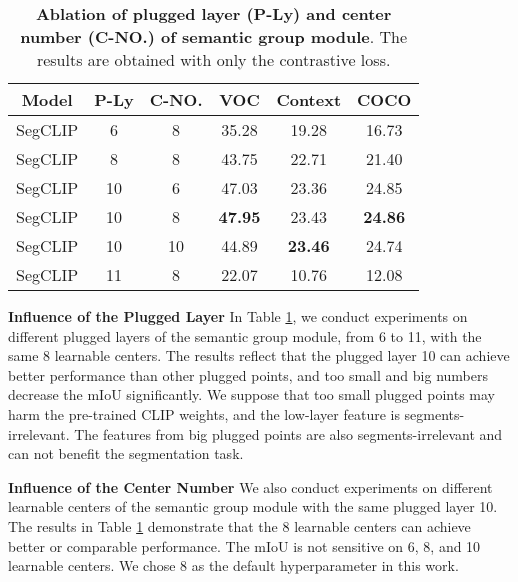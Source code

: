 \documentclass{article}
\theoremstyle{plain}
\theoremstyle{definition}
\theoremstyle{remark}
\begin{document}
\begin{table}[tp]
    \setlength{\tabcolsep}{5pt}
    \centering
    \begin{tabular}{cccccc}
        \toprule
        Model     & P-Ly & C-NO. & VOC & Context & COCO \\ \midrule
        SegCLIP     & 6  & 8 & 35.28 & 19.28 & 16.73 \\
        SegCLIP     & 8  & 8 & 43.75 & 22.71 & 21.40 \\
        SegCLIP     & 10  & 6 & 47.03 & 23.36 & 24.85 \\
        SegCLIP     & 10  & 8 & \textbf{47.95} & 23.43 & \textbf{24.86} \\
        SegCLIP     & 10  & 10 & 44.89 & \textbf{23.46} & 24.74 \\
        SegCLIP     & 11  & 8 & 22.07 & 10.76 & 12.08 \\
        \bottomrule
    \end{tabular}
    \caption{\textbf{Ablation of plugged layer (P-Ly) and center number (C-NO.) of semantic group module}. The results are obtained with only the contrastive loss.}
    \label{tab:result_of_plug_group}
\end{table}

\vspace{0.1cm}
\noindent
\textbf{Influence of the Plugged Layer} \quad 
In Table \ref{tab:result_of_plug_group}, we conduct experiments on different plugged layers of the semantic group module, from 6 to 11, with the same 8 learnable centers. The results reflect that the plugged layer 10 can achieve better performance than other plugged points, and too small and big numbers decrease the mIoU significantly. We suppose that too small plugged points may harm the pre-trained CLIP weights, and the low-layer feature is segments-irrelevant. The features from big plugged points are also segments-irrelevant and can not benefit the segmentation task.

\vspace{0.1cm}
\noindent
\textbf{Influence of the Center Number} \quad
We also conduct experiments on different learnable centers of the semantic group module with the same plugged layer 10. The results in Table \ref{tab:result_of_plug_group} demonstrate that the 8 learnable centers can achieve better or comparable performance. The mIoU is not sensitive on 6, 8, and 10 learnable centers. We chose 8 as the default hyperparameter in this work.
\end{document}
